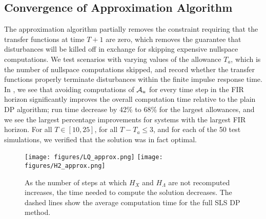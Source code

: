 \subsection{Convergence of Approximation Algorithm}
The approximation algorithm partially removes the constraint requiring that the transfer functions at time $T+1$ are zero, which removes the guarantee 
that disturbances will be killed off in exchange for skipping expensive nullspace computations. We test scenarios with varying values of the allowance $T_a$, which is the
number of nullspace computations skipped, and record whether the transfer functions properly terminate disturbances within the finite impulse response time. 
In , we see that avoiding computations of $\mathcal{A}_u$ for every time step in the FIR horizon significantly
improves the overall computation time relative to the plain DP algorithm; run time decrease by 42\% to 68\% for the largest allowances, and we see the largest percentage improvements for systems with the largest FIR horizon.
For all $T\in[10,25]$, for all $T - T_a \leq 3$, and for each of the 50 test simulations, we verified that the solution was in fact optimal.



\begin{figure}
    \texttt{[image: figures/LQ\_approx.png]}
    \texttt{[image: figures/H2\_approx.png]}
    \caption{As the number of steps at which $H_X$ and $H_{\Lambda}$ are not recomputed increases, the time needed to compute the solution decreases.
    The dashed lines show the average computation time for the full SLS DP method.}
    \label{fig:time_saved_skipped_iterations}
\end{figure}

